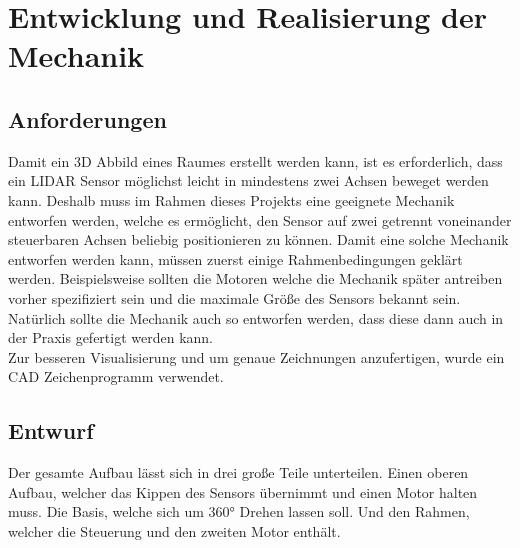 \chapter{Entwicklung und Realisierung der Mechanik}\label{chap:mechanik}

\section{Anforderungen}
Damit ein \acs{3D} Abbild eines Raumes erstellt werden kann, ist es erforderlich, dass ein \ac{LIDAR} Sensor möglichst leicht in mindestens zwei Achsen beweget werden kann. Deshalb muss im Rahmen dieses Projekts eine geeignete Mechanik entworfen werden, welche es ermöglicht, den Sensor auf zwei getrennt voneinander steuerbaren Achsen beliebig positionieren zu können. Damit eine solche Mechanik entworfen werden kann, müssen zuerst einige Rahmenbedingungen geklärt werden. Beispielsweise sollten die Motoren welche die Mechanik später antreiben vorher spezifiziert sein und die maximale Größe des Sensors bekannt sein. Natürlich sollte die Mechanik auch so entworfen werden, dass diese dann auch in der Praxis gefertigt werden kann.\\
Zur besseren Visualisierung und um genaue Zeichnungen anzufertigen, wurde ein \ac{CAD} Zeichenprogramm verwendet. 
\section{Entwurf}
Der gesamte Aufbau lässt sich in drei große Teile unterteilen. Einen oberen Aufbau, welcher das Kippen des Sensors übernimmt und einen Motor halten muss. Die Basis, welche sich um 360° Drehen lassen soll. Und den Rahmen, welcher die Steuerung und den zweiten Motor enthält. 

